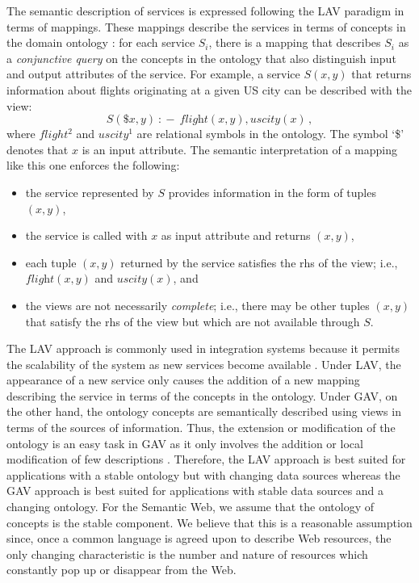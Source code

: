 \documentclass{llncs}
\newcommand{\qrule}{:\!\!-}
\newcommand{\flight}{\textit{flight}}
\newcommand{\UScity}{\textit{uscity}}
\begin{document}
The semantic description of services is expressed following the
LAV paradigm in terms of mappings. These mappings describe the
services in terms of concepts in the domain ontology \cite{Ullman00}:
for each service $S_i$, there is a mapping that describes $S_i$
as a \emph{conjunctive query} on the concepts in the ontology that
also distinguish input and output attributes of the service.
For example, a service $S(x,y)$ that returns information about
flights originating at a given US city can be described with the view:
\[ S(\$x,y)\ \qrule\ \flight(x,y), \UScity(x)\,, \]
where $flight^2$ and $uscity^1$ are relational symbols in the
ontology. The symbol `\$' denotes that $x$ is an input attribute. 
The semantic interpretation of a mapping like this one enforces the following:
\begin{itemize}
\item the service represented by $S$ provides information in the
      form of tuples $(x,y)$,
\item the service is called with $x$ as input attribute and returns $(x,y)$,
\item each tuple $(x,y)$ returned by the service satisfies the rhs
      of the view; i.e., $\flight(x,y)$ and $\UScity(x)$, and
\item the views are not necessarily \emph{complete}; i.e., there may be
      other tuples $(x,y)$ that satisfy the rhs of the view but which
      are not available through $S$.
\end{itemize}

The LAV approach is commonly used in integration systems because it permits
the scalability of the system as new services become available \cite{Ullman00}.
Under LAV, the appearance of a new service only causes the addition of a new
mapping describing the service in terms of the concepts in the ontology.
Under GAV, on the other hand, the ontology concepts are semantically described
using views in terms of the sources of information.
Thus, the extension or modification of the ontology is an easy task in GAV as
it only involves the addition or local modification of few descriptions
\cite{Ullman00}.
Therefore, the LAV approach is best suited for applications with a stable
ontology but with changing data sources whereas the GAV approach is best
suited for applications with stable data sources and a changing ontology.
For the Semantic Web, we assume that the ontology of concepts is the stable
component. We believe that this is a reasonable assumption since, once a
common language is agreed upon to describe Web resources, the only changing
characteristic is the number and nature of resources which constantly pop
up or disappear from the Web.
\end{document}
